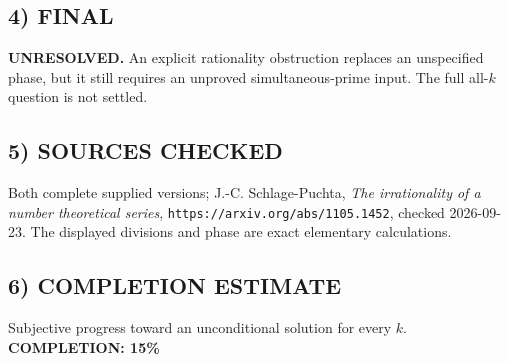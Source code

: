 \subsection*{4) FINAL}
\textbf{UNRESOLVED.} An explicit rationality obstruction replaces an unspecified phase, but it still requires an unproved simultaneous-prime input. The full all-$k$ question is not settled.
\subsection*{5) SOURCES CHECKED}
Both complete supplied versions; J.-C. Schlage-Puchta, \emph{The irrationality of a number theoretical series}, \texttt{https://arxiv.org/abs/1105.1452}, checked 2026-09-23. The displayed divisions and phase are exact elementary calculations.
\subsection*{6) COMPLETION ESTIMATE}
Subjective progress toward an unconditional solution for every $k$.
\textbf{COMPLETION: 15\%}
